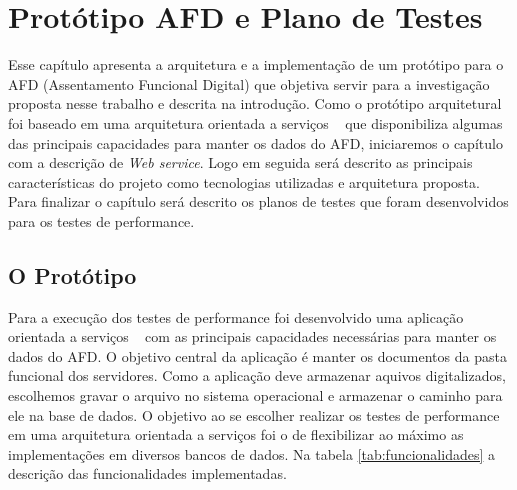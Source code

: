 \chapter{Protótipo AFD e Plano de Testes}

Esse capítulo apresenta a arquitetura e a implementação de um protótipo para o AFD (Assentamento Funcional Digital) que objetiva servir para a investigação proposta nesse trabalho e descrita na introdução. Como o protótipo arquitetural foi baseado em uma arquitetura orientada a serviços ~\cite{erl:2007} que disponibiliza algumas das principais capacidades para manter os dados do AFD, iniciaremos o capítulo com a descrição de \textit{Web service}. Logo em seguida será descrito as principais características do projeto como tecnologias utilizadas e arquitetura proposta. Para finalizar o capítulo será descrito os planos de testes que foram desenvolvidos para os testes de performance.



\section{O Protótipo}

Para a execução dos testes de performance foi desenvolvido uma aplicação orientada a serviços ~\cite{erl:2007} com as principais capacidades necessárias para manter os dados do AFD. O objetivo central da aplicação é manter os documentos da pasta funcional dos servidores. Como a aplicação deve armazenar aquivos digitalizados, escolhemos gravar o arquivo no sistema operacional e armazenar o caminho para ele na base de dados. O objetivo ao se escolher realizar os testes de performance em uma arquitetura orientada a serviços foi o de flexibilizar ao máximo as implementações em diversos bancos de dados. Na tabela \ref{tab:funcionalidades} a descrição das funcionalidades implementadas.

\renewcommand{\arraystretch}{3}

